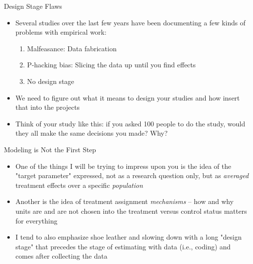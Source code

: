 \documentclass{beamer}
\begin{document}
\begin{frame}{Design Stage Flaws}

\begin{itemize}
\item Several studies over the last few years have been documenting a few kinds of problems with empirical work:
	\begin{enumerate}
	\item Malfeasance: Data fabrication
	\item P-hacking bias: Slicing the data up until you find effects
	\item No design stage
	\end{enumerate}
\item We need to figure out what it means to design your studies and how insert that into the projects
\item Think of your study like this: if you asked 100 people to do the study, would they all make the same decisions you made?  Why? 

\end{itemize}

\end{frame}



\begin{frame}{Modeling is Not the First Step}

\begin{itemize}
\item One of the things I will be trying to impress upon you is the idea of the "target parameter" expressed, not as a research question only, but as \emph{averaged} treatment effects over a specific \emph{population}
\item Another is the idea of treatment assignment \emph{mechanisms} -- how and why units are and are not chosen into the treatment versus control status matters for everything
\item I tend to also emphasize shoe leather and slowing down with a long "design stage" that precedes the stage of estimating with data (i.e., coding) and comes after collecting the data
\end{itemize}

\end{frame}
\end{document}
